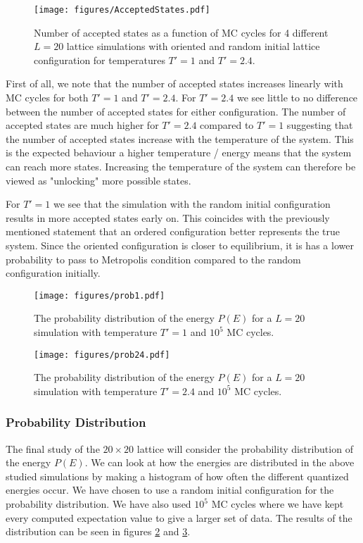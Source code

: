 \documentclass[a4paper, 10pt, reqno]{amsart}
\begin{document}
\begin{figure}
    \centering
    \texttt{[image: figures/AcceptedStates.pdf]}
    \caption{Number of accepted states as a function of MC cycles for 4 different $L = 20$ lattice simulations with oriented and random initial lattice configuration for temperatures $T' = 1$ and $T' = 2.4$.}
    \label{fig: Accepted}
\end{figure}

First of all, we note that the number of accepted states increases linearly with MC cycles for both $T' = 1$ and $T' = 2.4$. For $T' =2.4$ we see little to no difference between the number of accepted states for either configuration. The number of accepted states are much higher for $T' = 2.4$ compared to $T' = 1$ suggesting that the number of accepted states increase with the temperature of the system. This is the expected behaviour a higher temperature / energy means that the system can reach more states. Increasing the temperature of the system can therefore be viewed as "unlocking" more possible states.

For $T' = 1$ we see that the simulation with the random initial configuration results in more accepted states early on. This coincides with the previously mentioned statement that an ordered configuration better represents the true system. Since the oriented configuration is closer to equilibrium, it is has a lower probability to pass to Metropolis condition compared to the random configuration initially.


\begin{figure}
    \centering
    \texttt{[image: figures/prob1.pdf]}
    \caption{The probability distribution of the energy $P(E)$ for a $L = 20$ simulation with temperature $T' = 1$ and $10^5$ MC cycles.}
    \label{fig: prob1}
\end{figure}

\begin{figure}
    \centering
    \texttt{[image: figures/prob24.pdf]}
    \caption{The probability distribution of the energy $P(E)$ for a $L = 20$ simulation with temperature $T' = 2.4$ and $10^5$ MC cycles.}
    \label{fig: prob24}
\end{figure}

\subsubsection{Probability Distribution} The final study of the $20 \times 20$ lattice will consider the probability distribution of the energy $P(E)$. We can look at how the energies are distributed in the above studied simulations by making a histogram of how often the different quantized energies occur. We have chosen to use a random initial configuration for the probability distribution. We have also used $10^5$ MC cycles where we have kept every computed expectation value to give a larger set of data. The results of the distribution can be seen in figures \ref{fig: prob1} and \ref{fig: prob24}.
\end{document}
